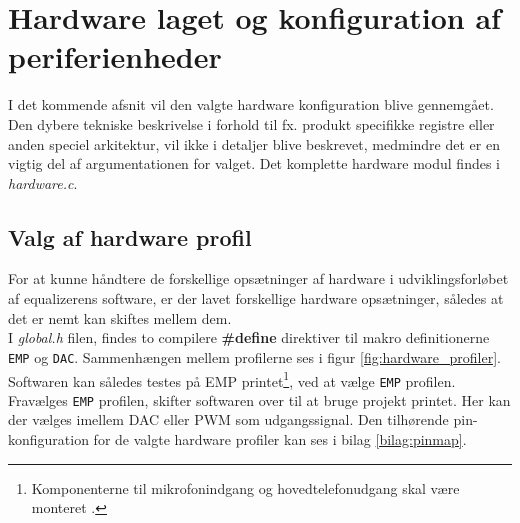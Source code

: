\section{Hardware laget og konfiguration af periferienheder}
I det kommende afsnit vil den valgte hardware konfiguration blive gennemgået. 
Den dybere tekniske beskrivelse i forhold til fx. produkt specifikke registre eller anden speciel arkitektur, vil ikke i detaljer blive beskrevet, medmindre det er en vigtig del af argumentationen for valget.
Det komplette hardware modul findes i \emph{hardware.c}.

\subsection{Valg af hardware profil}
For at kunne håndtere de forskellige opsætninger af hardware i udviklingsforløbet af equalizerens software, er der lavet forskellige hardware opsætninger, således at det er nemt kan skiftes mellem dem.
\\

I \textit{global.h} filen, findes to compilere \textbf{\#define} direktiver til makro definitionerne \texttt{EMP} og \texttt{DAC}.
Sammenhængen mellem profilerne ses i figur \ref{fig:hardware_profiler}. 
Softwaren kan således testes på EMP printet\footnote{Komponenterne til mikrofonindgang og hovedtelefonudgang skal være monteret \cite{emp-diagram}.}, ved at vælge \texttt{EMP} profilen.
Fravælges \texttt{EMP} profilen, skifter softwaren over til at bruge projekt printet.
Her kan der vælges imellem DAC eller PWM som udgangssignal.  
Den tilhørende pin-konfiguration for de valgte hardware profiler kan ses i bilag \ref{bilag:pinmap}.

